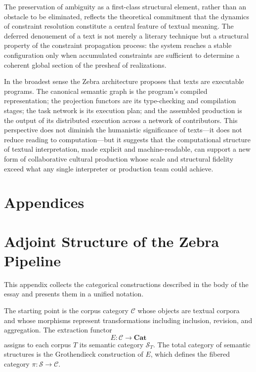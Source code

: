 \documentclass[12pt,a4paper]{article}
\begin{document}
The preservation of ambiguity as a first-class structural element, rather than an obstacle to be eliminated, reflects the theoretical commitment that the dynamics of constraint resolution constitute a central feature of textual meaning. The deferred denouement of a text is not merely a literary technique but a structural property of the constraint propagation process: the system reaches a stable configuration only when accumulated constraints are sufficient to determine a coherent global section of the presheaf of realizations.

In the broadest sense the Zebra architecture proposes that texts are executable programs. The canonical semantic graph is the program's compiled representation; the projection functors are its type-checking and compilation stages; the task network is its execution plan; and the assembled production is the output of its distributed execution across a network of contributors. This perspective does not diminish the humanistic significance of texts—it does not reduce reading to computation—but it suggests that the computational structure of textual interpretation, made explicit and machine-readable, can support a new form of collaborative cultural production whose scale and structural fidelity exceed what any single interpreter or production team could achieve.

\newpage
\section*{Appendices}

\appendix

\section{Adjoint Structure of the Zebra Pipeline}

This appendix collects the categorical constructions described in the body of the essay and presents them in a unified notation.

The starting point is the corpus category $\mathcal{C}$ whose objects are textual corpora and whose morphisms represent transformations including inclusion, revision, and aggregation. The extraction functor
\[
E : \mathcal{C} \rightarrow \mathbf{Cat}
\]
assigns to each corpus $T$ its semantic category $\mathcal{S}_T$. The total category of semantic structures is the Grothendieck construction of $E$, which defines the fibered category $\pi : \mathcal{S} \rightarrow \mathcal{C}$.
\end{document}
